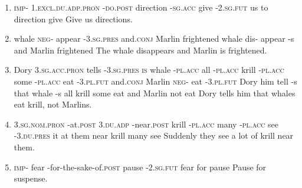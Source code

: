 \begin{enumerate}
\item
{}
{\textsc{imp}- \textsc{1.excl.du.adp.pron} -\textsc{do.post} direction -\textsc{sg.acc} give -\textsc{2.sg.fut}} 
{{} us to direction {} give {}}
{Give us directions.}

\item
{}
{whale \textsc{neg}- appear -\textsc{3.sg.pres} and.\textsc{conj} Marlin frightened}
{whale dis- appear -s and Marlin frightened}
{The whale disappears and Marlin is frightened.}

\item
{}
{Dory \textsc{3.sg.acc.pron} tells -\textsc{3.sg.pres} \textsc{is} whale -\textsc{pl.acc} all -\textsc{pl.acc} krill -\textsc{pl.acc} some -\textsc{pl.acc} eat -\textsc{3.pl.fut} and.\textsc{conj} Marlin \textsc{neg}- eat -\textsc{3.pl.fut}}
{Dory him tell -s that whale -s all {} krill {} some {} eat {} and Marlin not eat {}}
{Dory tells him that whales eat krill, not Marlins.}

\item
{}
{\textsc{3.sg.nom.pron} -at.\textsc{post} \textsc{3.du.adp} -near.\textsc{post} krill -\textsc{pl.acc} many -\textsc{pl.acc} see -\textsc{3.du.pres}}
{it at them near krill {} many {} see {}}
{Suddenly they see a lot of krill near them.}

\item
{}
{\textsc{imp}- fear -for-the-sake-of.\textsc{post} pause -\textsc{2.sg.fut}}
{{} fear for pause {}}
{Pause for suspense.}


\end{enumerate}
